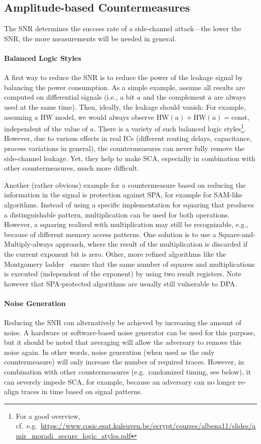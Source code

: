 \subsection{Amplitude-based Countermeasures}
The \ac{SNR} determines the success rate of a side-channel attack---the lower the \ac{SNR}, the more measurements will be needed in general. 

\paragraph{Balanced Logic Styles}
A first way to reduce the \ac{SNR} is to reduce the power of the leakage signal by balancing the power consumption. As a simple example, assume all results are computed on differential signals (i.e., a bit $a$ and the complement $\overline{a}$ are always used at the same time). Then, ideally, the leakage should vanish: For example, assuming a \ac{HW} model, we would always observe $\mbox{HW}\left(a\right) + \mbox{HW}\left(\overline{a}\right) = \mbox{const}$, independent of the value of $a$. There is a variety of such balanced logic styles\footnote{For a good overview, cf.~e.g.~\url{https://www.cosic.esat.kuleuven.be/ecrypt/courses/albena11/slides/amir_moradi_secure_logic_styles.pdf}}. However, due to various effects in real \acp{IC} (different routing delays, capacitance, process variations in general), the countermeasures can never fully remove the side-channel leakage. Yet, they help to make \ac{SCA}, especially in combination with other countermeasures, much more difficult.

Another (rather obvious) example for a countermeasure based on reducing the information in the signal is protection against \ac{SPA}, for example for \ac{SAM}-like algorithms. Instead of using a specific implementation for squaring that produces a distinguishable pattern, multiplication can be used for both operations. However, a squaring realized with multiplication may still be recognizable, e.g., because of different memory access patterns. One solution is to use a Square-and-Multiply-always approach, where the result of the multiplication is discarded if the current exponent bit is zero. Other, more refined algorithms like the Montgomery ladder~\cite{montgomery1987speeding} ensure that the same number of squares and multiplications is executed (independent of the exponent) by using two result registers. Note however that \ac{SPA}-protected algorithms are usually still vulnerable to \ac{DPA}.

\paragraph{Noise Generation}
Reducing the \ac{SNR} can alternatively be achieved by increasing the amount of noise. A hardware or software-based noise generator can be used for this purpose, but it should be noted that averaging will allow the adversary to remove this noise again. In other words, noise generation (when used as the only countermeasure) will only increase the number of required traces. However, in combination with other countermeasures (e.g.~randomized timing, see below), it can severely impede \ac{SCA}, for example, because an adversary can no longer re-align traces in time based on signal patterns.

